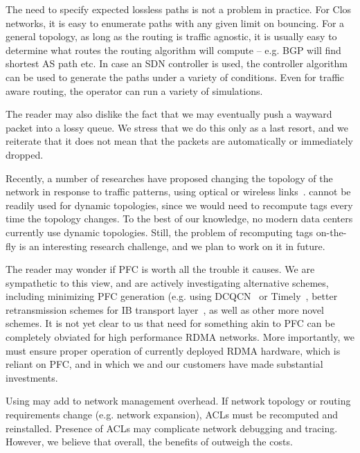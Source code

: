  The need to specify expected
lossless paths is not a problem in practice. For Clos networks, it is easy to
enumerate paths with any given limit on bouncing. For a general topology, as long
as the routing is traffic agnostic, it is usually easy to determine what routes
the routing algorithm will compute -- e.g. BGP will find shortest AS path etc.
In case an SDN controller is used, the controller algorithm can be used to
generate the paths under a variety of conditions. Even for traffic aware
routing, the operator can run a variety of simulations. 

The reader may also dislike the fact that we may eventually push a wayward
packet into a lossy queue. We stress that we do this only as a last resort, and
we reiterate that it does not mean that the packets are automatically or
immediately dropped. 

 Recently, a number of researches have proposed
changing the topology of the network in response to traffic patterns, using
optical or wireless links~\cite{helios,flyways,projector,mirrormirror}.
\sysname{} cannot be readily used for dynamic topologies, since we would need to
recompute tags every time the topology changes. To the best of our knowledge, no
modern data centers currently use dynamic topologies. Still, the problem of
recomputing tags on-the-fly is an interesting research challenge, and we plan to
work on it in future.

 The reader may wonder if PFC is worth all the trouble
it causes. We are sympathetic to this view, and are actively investigating
alternative schemes, including minimizing PFC generation (e.g.  using
DCQCN~\cite{dcqcn} or Timely~\cite{timely}, better retransmission schemes for IB
transport layer~\cite{xxx}, as well as other more novel schemes.  It is not yet
clear to us that need for something akin to PFC can be completely obviated for
high performance RDMA networks. More importantly, we must ensure proper
operation of currently deployed RDMA hardware, which is reliant on PFC, and in
which we and our customers have made substantial investments.

 Using \sysname{} may add to network management
overhead. If network topology or routing requirements change (e.g. network
expansion), ACLs must be recomputed and reinstalled. Presence of ACLs may
complicate network debugging and tracing. However, we believe that overall, the
benefits of \sysname{} outweigh the costs.
